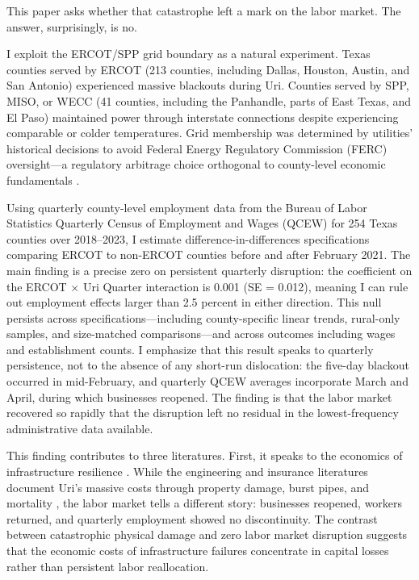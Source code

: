 \documentclass[12pt]{article}
\begin{document}
This paper asks whether that catastrophe left a mark on the labor market. The answer, surprisingly, is no.

I exploit the ERCOT/SPP grid boundary as a natural experiment. Texas counties served by ERCOT (213 counties, including Dallas, Houston, Austin, and San Antonio) experienced massive blackouts during Uri. Counties served by SPP, MISO, or WECC (41 counties, including the Panhandle, parts of East Texas, and El Paso) maintained power through interstate connections despite experiencing comparable or colder temperatures. Grid membership was determined by utilities' historical decisions to avoid Federal Energy Regulatory Commission (FERC) oversight---a regulatory arbitrage choice orthogonal to county-level economic fundamentals \citep{rhodes2021texas}.

Using quarterly county-level employment data from the Bureau of Labor Statistics Quarterly Census of Employment and Wages (QCEW) for 254 Texas counties over 2018--2023, I estimate difference-in-differences specifications comparing ERCOT to non-ERCOT counties before and after February 2021. The main finding is a precise zero on persistent quarterly disruption: the coefficient on the ERCOT $\times$ Uri Quarter interaction is 0.001 (SE = 0.012), meaning I can rule out employment effects larger than 2.5 percent in either direction. This null persists across specifications---including county-specific linear trends, rural-only samples, and size-matched comparisons---and across outcomes including wages and establishment counts. I emphasize that this result speaks to quarterly persistence, not to the absence of any short-run dislocation: the five-day blackout occurred in mid-February, and quarterly QCEW averages incorporate March and April, during which businesses reopened. The finding is that the labor market recovered so rapidly that the disruption left no residual in the lowest-frequency administrative data available.

This finding contributes to three literatures. First, it speaks to the economics of infrastructure resilience \citep{rose2004defining,hallegatte2019adapt}. While the engineering and insurance literatures document Uri's massive costs through property damage, burst pipes, and mortality \citep{busby2021cascading,lee2022uri}, the labor market tells a different story: businesses reopened, workers returned, and quarterly employment showed no discontinuity. The contrast between catastrophic physical damage and zero labor market disruption suggests that the economic costs of infrastructure failures concentrate in capital losses rather than persistent labor reallocation.
\end{document}
